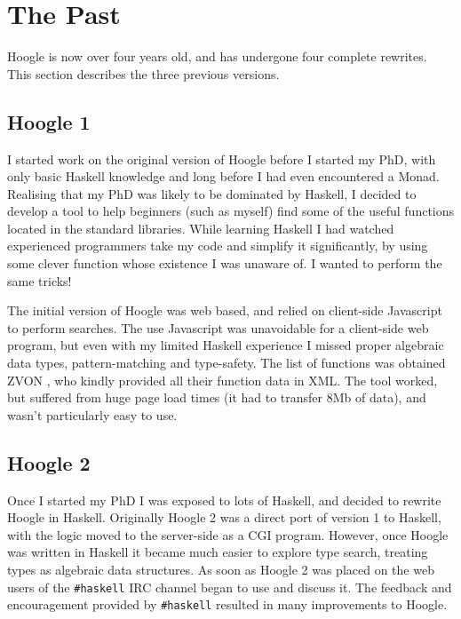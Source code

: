 \documentclass{tmr}
\begin{document}
\section{The Past}

Hoogle is now over four years old, and has undergone four complete rewrites. This section describes the three previous versions.

\subsection{Hoogle 1}

I started work on the original version of Hoogle before I started my PhD, with only basic Haskell knowledge and long before I had even encountered a Monad. Realising that my PhD was likely to be dominated by Haskell, I decided to develop a tool to help beginners (such as myself) find some of the useful functions located in the standard libraries. While learning Haskell I had watched experienced programmers take my code and simplify it significantly, by using some clever function whose existence I was unaware of. I wanted to perform the same tricks!

The initial version of Hoogle was web based, and relied on client-side Javascript to perform searches. The use Javascript was unavoidable for a client-side web program, but even with my limited Haskell experience I missed proper algebraic data types, pattern-matching and type-safety. The list of functions was obtained ZVON \cite{zvon}, who kindly provided all their function data in XML. The tool worked, but suffered from huge page load times (it had to transfer 8Mb of data), and wasn't particularly easy to use.

\subsection{Hoogle 2}

Once I started my PhD I was exposed to lots of Haskell, and decided to rewrite Hoogle in Haskell. Originally Hoogle 2 was a direct port of version 1 to Haskell, with the logic moved to the server-side as a CGI program. However, once Hoogle was written in Haskell it became much easier to explore type search, treating types as algebraic data structures. As soon as Hoogle 2 was placed on the web users of the \verb"#haskell" IRC channel \cite{irc} began to use and discuss it. The feedback and encouragement provided by \verb"#haskell" resulted in many improvements to Hoogle.
\end{document}
